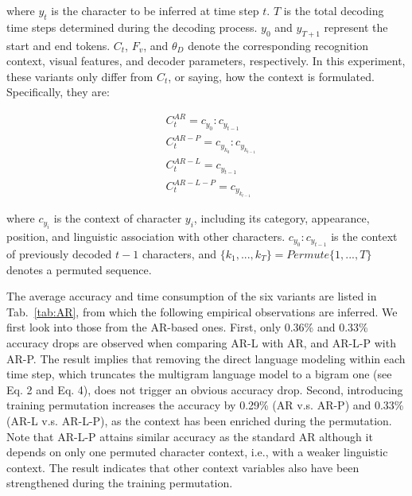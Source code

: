 \documentclass[10pt,journal,compsoc]{IEEEtran}
\begin{document}
\noindent where $y_t$ is the character to be inferred at time step $t$. $T$ is the total decoding time steps determined during the decoding process. $y_0$ and $y_{T+1}$ represent the start and end tokens. $C_t$, $F_v$, and $\theta_D$ denote the corresponding recognition context, visual features, and decoder parameters, respectively. In this experiment, these variants only differ from $C_t$, or saying, how the context is formulated. Specifically, they are: 

\begin{align}
&C_t^{AR} = c_{y_0}:c_{y_{t-1}} \\
    &C_t^{AR-P} = c_{y_{k_0}}:c_{y_{k_{t-1}}} \\
    &C_t^{AR-L} = c_{y_{t-1}} \\
    &C_t^{AR-L-P} = c_{y_{k_{t-1}}}
\end{align}

\noindent where $c_{y_i}$ is the context of character $y_i$, including its category, appearance, position, and linguistic association with other characters. $c_{y_0}:c_{y_{t-1}}$ is the context of previously decoded $t-1$ characters, and $\{k_1, ..., k_{T}\} = Permute\{1,...,T\}$ denotes a permuted sequence.


\begin{table}[t]\footnotesize
\caption{Results of the six decoder
variants.}
\centering
{}

\label{tab:AR}
\end{table}


The average accuracy and time consumption of the six variants are listed in Tab.~\ref{tab:AR}, from which the following empirical observations are inferred. We first look into those from the AR-based ones. First, only 0.36\% and 0.33\% accuracy drops are observed when comparing AR-L with AR, and AR-L-P with AR-P. The result implies that removing the direct language modeling within each time step, which truncates the multigram language model to a bigram one (see Eq. 2 and Eq. 4), does not trigger an obvious accuracy drop. Second, introducing training permutation increases the accuracy by 0.29\% (AR v.s. AR-P) and 0.33\% (AR-L v.s. AR-L-P), as the context has been enriched during the permutation. Note that AR-L-P attains similar accuracy as the standard AR although it depends on only one permuted character context, i.e., with a weaker linguistic context. The result indicates that other context variables also have been strengthened during the training permutation.
\end{document}
